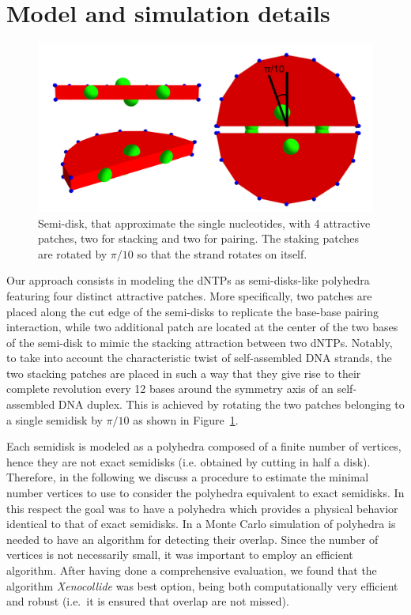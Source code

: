 \documentclass[aip,jcp, amsmath, amssymb, reprint]{revtex4-1}
\begin{document}
\section{\label{sec:level1}Model and simulation details}
\begin{figure}[h!]
\includegraphics[width=1\linewidth]{rota.png}
\caption{\label{fig:rota} Semi-disk, that approximate the single nucleotides, with 4 attractive patches, two for stacking and two for pairing. The staking patches are rotated by $\pi/10$ so that the strand rotates on itself.}
\end{figure}
Our approach consists in modeling the dNTPs as semi-disks-like polyhedra 
featuring four distinct attractive patches. More specifically, two patches are placed along the cut
edge of the semi-disks to replicate the base-base pairing interaction, while two additional patch are located
at the center of the two bases of the semi-disk to mimic the stacking attraction between two dNTPs. 
Notably, to take into account the characteristic twist
of self-assembled DNA strands, the two stacking patches are 
placed in such a way that they give rise to their complete revolution
every 12 bases around the symmetry axis of an self-assembled DNA duplex. 
This is achieved by rotating the two patches belonging to a single semidisk by $\pi/10$ 
as shown in Figure~\ref{fig:rota}. 


Each semidisk is modeled as a polyhedra composed of a finite number of vertices, hence they are not exact semidisks (i.e. 
obtained by cutting in half a disk). Therefore, in the following we discuss a procedure to estimate the minimal number 
vertices to use to consider the polyhedra equivalent to exact semidisks. In this respect the goal was to have a polyhedra
which provides a physical behavior identical to that of exact semidisks. In a Monte Carlo simulation of polyhedra is needed
to have an algorithm for detecting their overlap. Since the number of vertices is not necessarily small, 
it was important to employ an efficient algorithm. After having done a comprehensive
evaluation, we found that the algorithm {\it Xenocollide}\cite{libccd} was best option, being both computationally very efficient 
and robust (i.e.~it is ensured that overlap are not missed).\\
\end{document}
